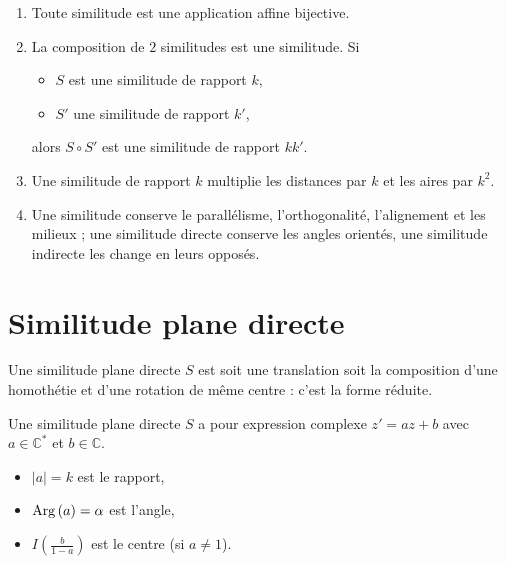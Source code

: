             \begin{prop}
                  \begin{enumerate}
                        \item Toute similitude est une application affine bijective.
                        \item La composition de $2$ similitudes est une similitude.
                              Si
                              \begin{itemize}
                                    \item $S$ est une similitude de rapport $k$,
                                    \item $S'$ une similitude de rapport $k'$,
                              \end{itemize}
                              alors $S \circ S'$ est une similitude de rapport $kk'$.
                        \item Une similitude de rapport $k$ multiplie les distances par $k$ et les aires par $k^2$.
                        \item Une similitude conserve le parall\'elisme, l'orthogonalit\'e, l'alignement et les milieux ;
                              une similitude directe conserve les angles orient\'es, une similitude indirecte les change en leurs oppos\'es.
                  \end{enumerate}
            \end{prop}
      \section{Similitude plane directe}
            Une similitude plane directe $S$ est soit une translation
            soit la composition d'une homoth\'etie et d'une rotation de m\^eme centre :
            c'est la forme r\'eduite.
            
            Une similitude plane directe $S$ a pour expression complexe $z' = az + b$ avec $a \in \mathbb{C}^*$ et $b \in \mathbb{C}$.
            \begin{itemize}
                  \item $|a| = k$ est le rapport,
                  \item $\mathrm{Arg}\left( a \right) = \alpha$ est l'angle,
                  \item $I\left(\frac{b}{1-a}\right)$ est le centre (si $a\neq 1$).
            \end{itemize}
            
